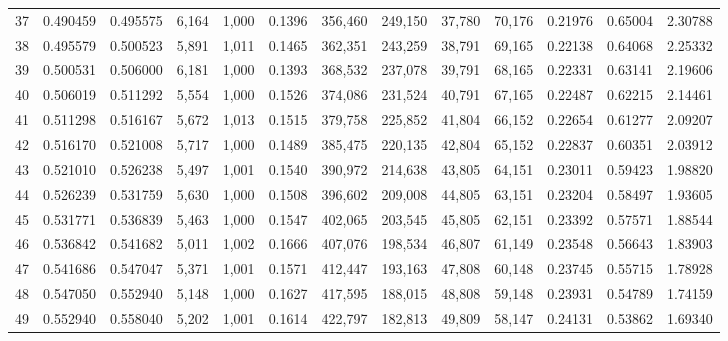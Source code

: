 \begin{tabular}{rrrrrrrrrrrrr}
37  &  0.490459 &  0.495575 &   6,164 &  1,000 &                                     0.1396 &  356,460 &  249,150 &   37,780 &   70,176 &  0.21976 &  0.65004 &  2.30788 \\
38  &  0.495579 &  0.500523 &   5,891 &  1,011 &                                     0.1465 &  362,351 &  243,259 &   38,791 &   69,165 &  0.22138 &  0.64068 &  2.25332 \\
39  &  0.500531 &  0.506000 &   6,181 &  1,000 &                                     0.1393 &  368,532 &  237,078 &   39,791 &   68,165 &  0.22331 &  0.63141 &  2.19606 \\
40  &  0.506019 &  0.511292 &   5,554 &  1,000 &                                     0.1526 &  374,086 &  231,524 &   40,791 &   67,165 &  0.22487 &  0.62215 &  2.14461 \\
41  &  0.511298 &  0.516167 &   5,672 &  1,013 &                                     0.1515 &  379,758 &  225,852 &   41,804 &   66,152 &  0.22654 &  0.61277 &  2.09207 \\
42  &  0.516170 &  0.521008 &   5,717 &  1,000 &                                     0.1489 &  385,475 &  220,135 &   42,804 &   65,152 &  0.22837 &  0.60351 &  2.03912 \\
43  &  0.521010 &  0.526238 &   5,497 &  1,001 &                                     0.1540 &  390,972 &  214,638 &   43,805 &   64,151 &  0.23011 &  0.59423 &  1.98820 \\
44  &  0.526239 &  0.531759 &   5,630 &  1,000 &                                     0.1508 &  396,602 &  209,008 &   44,805 &   63,151 &  0.23204 &  0.58497 &  1.93605 \\
45  &  0.531771 &  0.536839 &   5,463 &  1,000 &                                     0.1547 &  402,065 &  203,545 &   45,805 &   62,151 &  0.23392 &  0.57571 &  1.88544 \\
46  &  0.536842 &  0.541682 &   5,011 &  1,002 &                                     0.1666 &  407,076 &  198,534 &   46,807 &   61,149 &  0.23548 &  0.56643 &  1.83903 \\
47  &  0.541686 &  0.547047 &   5,371 &  1,001 &                                     0.1571 &  412,447 &  193,163 &   47,808 &   60,148 &  0.23745 &  0.55715 &  1.78928 \\
48  &  0.547050 &  0.552940 &   5,148 &  1,000 &                                     0.1627 &  417,595 &  188,015 &   48,808 &   59,148 &  0.23931 &  0.54789 &  1.74159 \\
49  &  0.552940 &  0.558040 &   5,202 &  1,001 &                                     0.1614 &  422,797 &  182,813 &   49,809 &   58,147 &  0.24131 &  0.53862 &  1.69340 \\

\end{tabular}

